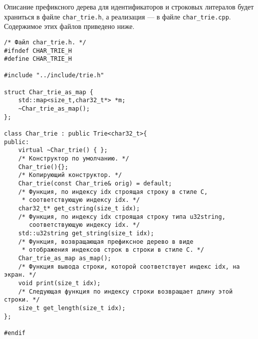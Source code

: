 \documentclass[10pt]{report}
\newcounter{defin}[section]
\begin{document}
Описание префиксного дерева для идентификаторов и строковых литералов будет храниться в файле \texttt{char_trie.h}, а реализация --- в файле \texttt{char_trie.cpp}. Содержимое этих файлов приведено ниже.
\begin{verbatim}
/* Файл char_trie.h. */
#ifndef CHAR_TRIE_H
#define CHAR_TRIE_H

#include "../include/trie.h"

struct Char_trie_as_map {
    std::map<size_t,char32_t*> *m;
    ~Char_trie_as_map();
};

class Char_trie : public Trie<char32_t>{
public:
    virtual ~Char_trie() { };
    /* Конструктор по умолчанию. */
    Char_trie(){};
    /* Копирующий конструктор. */
    Char_trie(const Char_trie& orig) = default;
    /* Функция, по индексу idx строящая строку в стиле C,
     * соответствующую индексу idx. */
    char32_t* get_cstring(size_t idx);
    /* Функция, по индексу idx строящая строку типа u32string,
       соответствующую индексу idx. */
    std::u32string get_string(size_t idx);
    /* Функция, возвращающая префиксное дерево в виде
     * отображения индексов строк в строки в стиле C. */
    Char_trie_as_map as_map();
    /* Функция вывода строки, которой соответствует индекс idx, на экран. */
    void print(size_t idx);
    /* Следующая функция по индексу строки возвращает длину этой строки. */
    size_t get_length(size_t idx);
};

#endif
\end{verbatim}
\end{document}
